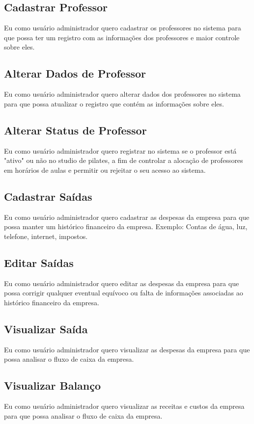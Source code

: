 \subsection[Cadastrar Professor]{Cadastrar Professor}
Eu como usuário administrador quero cadastrar os professores no sistema para
que possa ter um registro com as informações dos professores e maior controle
sobre eles.

\subsection[Alterar Dados de Professor]{Alterar Dados de Professor}
Eu como usuário administrador quero alterar dados dos professores no sistema
para que possa atualizar o registro que contém as informações sobre eles.

\subsection[Alterar Status de Professor]{Alterar Status de Professor}
Eu como usuário administrador quero registrar no sistema se o professor está
"ativo" ou não no studio de pilates, a fim de controlar a alocação de
professores em horários de aulas e permitir ou rejeitar o seu acesso ao sistema.

\subsection[Cadastrar Saídas]{Cadastrar Saídas}
Eu como usuário administrador quero cadastrar as despesas da empresa para que
possa manter um histórico financeiro da empresa.
Exemplo: Contas de água, luz, telefone, internet, impostos.

\subsection[Editar Saídas]{Editar Saídas}
Eu como usuário administrador quero editar as despesas da empresa para que possa
corrigir qualquer eventual equívoco ou falta de informações associadas ao
histórico financeiro da empresa.

\subsection[Visualizar Saída]{Visualizar Saída}
Eu como usuário administrador quero visualizar as despesas da empresa para que
possa analisar o fluxo de caixa da empresa.

\subsection[Visualizar Balanço]{Visualizar Balanço}
Eu como usuário administrador quero visualizar as receitas e custos da empresa
para que possa analisar o fluxo de caixa da empresa.

